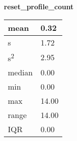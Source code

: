 \documentclass[12pt,twoside]{article}
\begin{document}
\bigskip


\bigskip


\bigskip

\textbf{reset\_profile\_count} 


\bigskip

\begin{longtable}[l]{|p{1.6712599in}|p{1.7309599in}|}
\hline
mean 
&
0.32 
\\\hline
s 
&
1.72 
\\\hline
s\textsuperscript{2} 
&
2.95 
\\\hline
median 
&
0.00 
\\\hline
min 
&
0.00 
\\\hline
max 
&
14.00 
\\\hline
range 
&
14.00 
\\\hline
IQR 
&
0.00 
\\\hline
\end{longtable}

\bigskip

\newline
\end{document}
